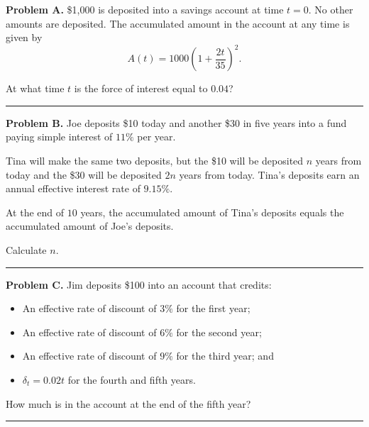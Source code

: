 \documentclass[11pt]{article}
\begin{document}
\newpage

\textbf{Problem A.} \$1{,}000 is deposited into a savings account at time $t=0$. No other amounts are deposited. The accumulated amount in the account at any time is given by
\[
A(t) = 1000\left(1 + \frac{2t}{35}\right)^2.
\]

At what time $t$ is the force of interest equal to $0.04$?

\medskip

\hrule

\medskip

\textbf{Problem B.} Joe deposits \$10 today and another \$30 in five years into a fund paying simple interest of $11\%$ per year.

Tina will make the same two deposits, but the \$10 will be deposited $n$ years from today and the \$30 will be deposited $2n$ years from today. Tina's deposits earn an annual effective interest rate of $9.15\%$.

At the end of $10$ years, the accumulated amount of Tina's deposits equals the accumulated amount of Joe's deposits.

Calculate $n$.

\medskip

\hrule


\medskip


\textbf{Problem C.} Jim deposits \$100 into an account that credits:
\begin{itemize}[leftmargin=2em]
    \item An effective rate of discount of $3\%$ for the first year;
    \item An effective rate of discount of $6\%$ for the second year;
    \item An effective rate of discount of $9\%$ for the third year; and
    \item $\delta_t = 0.02t$ for the fourth and fifth years.
\end{itemize}

How much is in the account at the end of the fifth year?

\medskip

\hrule
\end{document}
